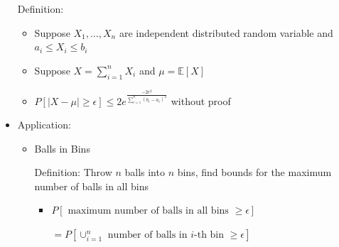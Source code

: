 \documentclass[a4paper]{article}
\begin{document}
\begin{itemize}
        Definition:
        \begin{itemize}
            \item Suppose $X_1, \dots, X_n$ are independent distributed random variable and $a_i \leq X_i \leq b_i$
            \item Suppose $X = \sum_{i=1}^n X_i$ and $\mu = \mathbb{E}[X]$
            \item $P[|X-\mu| \geq \epsilon] \leq 2 e^{\frac{-2\epsilon^2}{\sum_{i=1}^n(b_i - a_i)^2}}$ without proof
        \end{itemize}
    \item Application:
        \begin{itemize}
            \item Balls in Bins

                Definition: Throw $n$ balls into $n$ bins, find bounds for the maximum number of balls in all bins
                \begin{itemize}
                    \item $P[\text{ maximum number of balls in all bins } \geq \epsilon]$

                        $= P[\cup_{i=1}^n \text{ number of balls in $i$-th bin } \geq \epsilon]$


\end{itemize}
\end{itemize}
\end{itemize}
\end{document}
